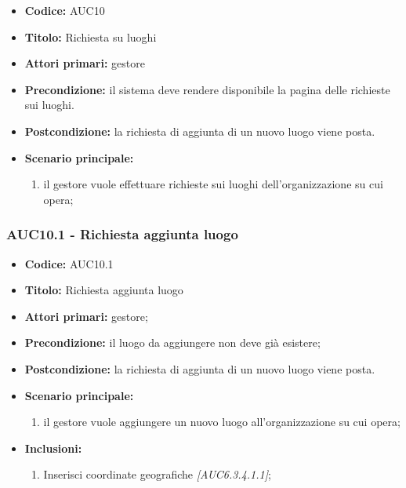 \documentclass[casi-duso]{subfiles}
\begin{document}
\begin{itemize}
  \item \textbf{Codice:} AUC10
  \item \textbf{Titolo:} Richiesta su luoghi
  \item \textbf{Attori primari:} gestore
  \item \textbf{Precondizione:} il sistema deve rendere disponibile la pagina delle richieste sui luoghi.
  \item \textbf{Postcondizione:} la richiesta di aggiunta di un nuovo luogo viene posta.
  \item \textbf{Scenario principale:}
  \begin{enumerate}
    \item il gestore vuole effettuare richieste sui luoghi dell'organizzazione su cui opera;
  \end{enumerate}
\end{itemize}

\subsubsection{AUC10.1 - Richiesta aggiunta luogo}%
\label{subsub:AUC10.1}
\begin{itemize}
  \item \textbf{Codice:} AUC10.1
  \item \textbf{Titolo:} Richiesta aggiunta luogo
  \item \textbf{Attori primari:} gestore;
  \item \textbf{Precondizione:} il luogo da aggiungere non deve già esistere;
  \item \textbf{Postcondizione:} la richiesta di aggiunta di un nuovo luogo viene posta.
  \item \textbf{Scenario principale:}
  \begin{enumerate}
    \item il gestore vuole aggiungere un nuovo luogo all'organizzazione su cui opera;
  \end{enumerate}
  \item \textbf{Inclusioni:}
  \begin{enumerate}
    \item Inserisci coordinate geografiche \emph{[AUC6.3.4.1.1]};
  \end{enumerate}
\end{itemize}
\end{document}
